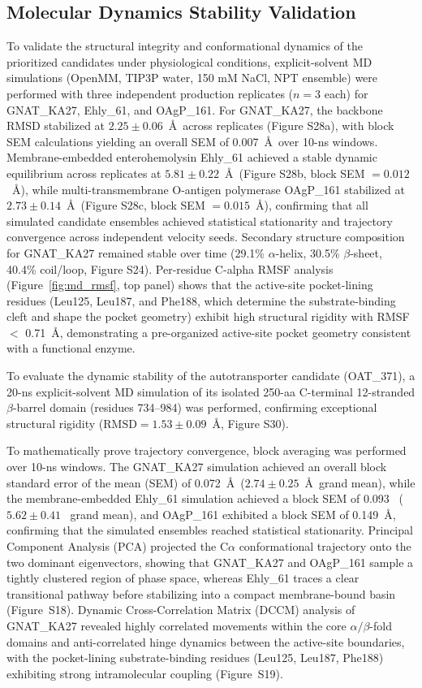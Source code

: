 \documentclass[pdflatex,sn-mathphys-num]{sn-jnl}
\begin{document}
\subsection{Molecular Dynamics Stability Validation}
To validate the structural integrity and conformational dynamics of the prioritized candidates under physiological conditions, explicit-solvent MD simulations (OpenMM, TIP3P water, 150 mM NaCl, NPT ensemble) were performed with three independent production replicates ($n=3$ each) for GNAT\_KA27, Ehly\_61, and OAgP\_161. For GNAT\_KA27, the backbone RMSD stabilized at $2.25 \pm 0.06$~\AA\ across replicates (Figure S28a), with block SEM calculations yielding an overall SEM of 0.007~\AA\ over 10-ns windows. Membrane-embedded enterohemolysin Ehly\_61 achieved a stable dynamic equilibrium across replicates at $5.81 \pm 0.22$~\AA\ (Figure S28b, block SEM $= 0.012$~\AA), while multi-transmembrane O-antigen polymerase OAgP\_161 stabilized at $2.73 \pm 0.14$~\AA\ (Figure S28c, block SEM $= 0.015$~\AA), confirming that all simulated candidate ensembles achieved statistical stationarity and trajectory convergence across independent velocity seeds. Secondary structure composition for GNAT\_KA27 remained stable over time (29.1\% $\alpha$-helix, 30.5\% $\beta$-sheet, 40.4\% coil/loop, Figure S24). Per-residue C-alpha RMSF analysis (Figure~\ref{fig:md_rmsf}, top panel) shows that the active-site pocket-lining residues (Leu125, Leu187, and Phe188, which determine the substrate-binding cleft and shape the pocket geometry) exhibit high structural rigidity with RMSF $<$ 0.71~\AA, demonstrating a pre-organized active-site pocket geometry consistent with a functional enzyme. 

To evaluate the dynamic stability of the autotransporter candidate (OAT\_371), a 20-ns explicit-solvent MD simulation of its isolated 250-aa C-terminal 12-stranded $\beta$-barrel domain (residues 734--984) was performed, confirming exceptional structural rigidity ($\text{RMSD} = 1.53 \pm 0.09$~\AA, Figure S30). 

To mathematically prove trajectory convergence, block averaging was performed over 10-ns windows. The GNAT\_KA27 simulation achieved an overall block standard error of the mean (SEM) of 0.072~\AA\ ($2.74 \pm 0.25$~\AA\ grand mean), while the membrane-embedded Ehly\_61 simulation achieved a block SEM of 0.093~\text{\AA} ($5.62 \pm 0.41$~\text{\AA} grand mean), and OAgP\_161 exhibited a block SEM of 0.149~\AA, confirming that the simulated ensembles reached statistical stationarity. Principal Component Analysis (PCA) projected the C$\alpha$ conformational trajectory onto the two dominant eigenvectors, showing that GNAT\_KA27 and OAgP\_161 sample a tightly clustered region of phase space, whereas Ehly\_61 traces a clear transitional pathway before stabilizing into a compact membrane-bound basin (Figure~S18). Dynamic Cross-Correlation Matrix (DCCM) analysis of GNAT\_KA27 revealed highly correlated movements within the core $\alpha/\beta$-fold domains and anti-correlated hinge dynamics between the active-site boundaries, with the pocket-lining substrate-binding residues (Leu125, Leu187, Phe188) exhibiting strong intramolecular coupling (Figure~S19).
\end{document}
